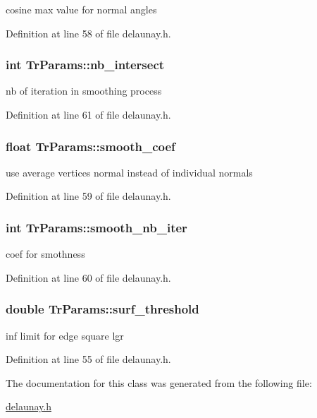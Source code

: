 cosine max value for normal angles 



Definition at line 58 of file delaunay.h.

\hypertarget{classTrParams_a6de5f7c969a55b7c9301177c2e38537d}{
\subsubsection[{nb\_\-intersect}]{\setlength{\rightskip}{0pt plus 5cm}int {\bf TrParams::nb\_\-intersect}}}
\label{classTrParams_a6de5f7c969a55b7c9301177c2e38537d}


nb of iteration in smoothing process 



Definition at line 61 of file delaunay.h.

\hypertarget{classTrParams_ab950f91fef639ad760b8c6911a36536c}{
\subsubsection[{smooth\_\-coef}]{\setlength{\rightskip}{0pt plus 5cm}float {\bf TrParams::smooth\_\-coef}}}
\label{classTrParams_ab950f91fef639ad760b8c6911a36536c}


use average vertices normal instead of individual normals 



Definition at line 59 of file delaunay.h.

\hypertarget{classTrParams_a404d1c301dd761f928c4b3688efa90c2}{
\subsubsection[{smooth\_\-nb\_\-iter}]{\setlength{\rightskip}{0pt plus 5cm}int {\bf TrParams::smooth\_\-nb\_\-iter}}}
\label{classTrParams_a404d1c301dd761f928c4b3688efa90c2}


coef for smothness 



Definition at line 60 of file delaunay.h.

\hypertarget{classTrParams_a3c2580990cc2a87aa9fb1d8f495eae84}{
\subsubsection[{surf\_\-threshold}]{\setlength{\rightskip}{0pt plus 5cm}double {\bf TrParams::surf\_\-threshold}}}
\label{classTrParams_a3c2580990cc2a87aa9fb1d8f495eae84}


inf limit for edge square lgr 



Definition at line 55 of file delaunay.h.



The documentation for this class was generated from the following file:\begin{DoxyCompactItemize}
\item 
\hyperlink{delaunay_8h}{delaunay.h}\end{DoxyCompactItemize}
